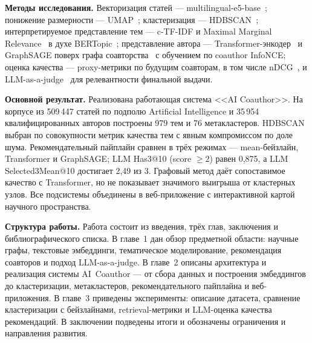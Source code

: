 \textbf{Методы исследования.} Векторизация статей — multilingual-e5-base~\cite{wang2024multilinguale5};
понижение размерности — UMAP~\cite{mcinnes2018umap}; кластеризация — HDBSCAN~\cite{campello2013hdbscan,
mcinnes2017hdbscanjoss}; интерпретируемое представление тем — c-TF-IDF
и Maximal Marginal Relevance~\cite{carbonell1998mmr} в духе BERTopic~\cite{grootendorst2022bertopic};
представление автора — Transformer-энкодер~\cite{vaswani2017attention} и GraphSAGE
поверх графа соавторства~\cite{hamilton2017graphsage} с обучением по coauthor InfoNCE;
оценка качества — proxy-метрики по будущим соавторам, в том числе nDCG~\cite{jarvelin2002ndcg},
и LLM-as-a-judge~\cite{zheng2023judging} для релевантности финальной выдачи.

\textbf{Основной результат.} Реализована работающая система <<AI Coauthor>>. На корпусе из
509\,447 статей по подполю Artificial Intelligence и 35\,954 квалифицированных авторов построены
979 тем и 76 метакластеров. HDBSCAN выбран по совокупности метрик качества тем с явным
компромиссом по доле шума. Рекомендательный пайплайн
сравнен в трёх режимах — mean-бейзлайн, Transformer и GraphSAGE; LLM Has3@10 (score $\geq 2$)
равен 0,875, а LLM Selected3Mean@10 достигает 2,49 из 3. Графовый метод даёт
сопоставимое качество с Transformer, но не показывает значимого выигрыша от кластерных узлов. Все
подсистемы объединены в веб-приложение
с интерактивной картой научного пространства.

\textbf{Структура работы.} Работа состоит из введения, трёх глав, заключения и
библиографического списка. В главе~1 дан обзор предметной области: научные графы, текстовые
эмбеддинги, тематическое моделирование, рекомендация соавторов и подход LLM-as-a-judge. В
главе~2 описаны архитектура и реализация системы AI~Coauthor — от сбора данных и построения
эмбеддингов до кластеризации, метакластеров, рекомендательного пайплайна и веб-приложения. В
главе~3 приведены эксперименты: описание датасета, сравнение кластеризации с бейзлайнами,
retrieval-метрики и LLM-оценка качества рекомендаций. В заключении подведены итоги и обозначены
ограничения и направления развития.
